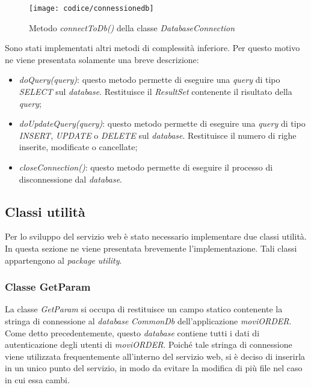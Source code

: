 \begin{figure}[!h] 
    \centering 
    \texttt{[image: codice/connessionedb]} 
    \caption{Metodo \textit{connectToDb()} della classe \textit{DatabaseConnection}}
\end{figure}


Sono stati implementati altri metodi di complessità inferiore. Per questo motivo ne viene presentata solamente una breve descrizione:
\begin{itemize}
	\item \textit{doQuery(query)}: questo metodo permette di eseguire una \textit{query} di tipo \textit{SELECT} sul \textit{database}. Restituisce il \textit{ResultSet} contenente il risultato della \textit{query};
	\item \textit{doUpdateQuery(query)}: questo metodo permette di eseguire una \textit{query} di tipo \textit{INSERT}, \textit{UPDATE} o \textit{DELETE} sul \textit{database}. Restituisce il numero di righe inserite, modificate o cancellate;
	\item \textit{closeConnection()}: questo metodo permette di eseguire il processo di disconnessione dal \textit{database}.
\end{itemize}

\subsection{Classi utilità}

Per lo sviluppo del servizio web è stato necessario implementare due classi utilità. In questa sezione ne viene presentata brevemente l'implementazione. Tali classi appartengono al \textit{package} \textit{utility}.

\subsubsection{Classe GetParam}

La classe \textit{GetParam} si occupa di restituisce un campo statico contenente la stringa di connessione al \textit{database} \textit{CommonDb} dell'applicazione \textit{moviORDER}. Come detto precedentemente, questo \textit{database} contiene tutti i dati di autenticazione degli utenti di \textit{moviORDER}. Poiché tale stringa di connessione viene utilizzata frequentemente all'interno del servizio web, si è deciso di inserirla in un unico punto del servizio, in modo da evitare la modifica di più file nel caso in cui essa cambi.

